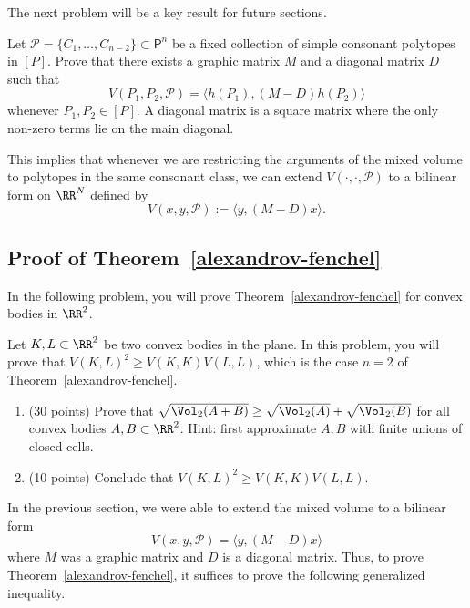 \documentclass[11pt]{article}
\begin{document}
The next problem will be a key result for future sections. 

\begin{prob} [30 points]
    Let $\mathcal{P} = \{C_1, \ldots, C_{n-2}\} \subset \mathsf{P}^n$ be a fixed collection of simple consonant polytopes in $[P]$. Prove that there exists a graphic matrix $M$ and a diagonal matrix $D$ such that 
    \[
        V(P_1, P_2, \mathcal{P}) = \langle h(P_1), (M-D) h(P_2) \rangle    
    \]
    whenever $P_1, P_2 \in [P]$. A diagonal matrix is a square matrix where the only non-zero terms lie on the main diagonal. 
\end{prob}

This implies that whenever we are restricting the arguments of the mixed volume to polytopes in the same consonant class, we can extend $V( \cdot, \cdot, \mathcal{P})$ to a bilinear form on $\RR^N$ defined by 
\[
    V(x, y, \mathcal{P}) := \langle y, (M-D)x \rangle. 
\]

\subsection{Proof of Theorem~\ref{alexandrov-fenchel}}
In the following problem, you will prove Theorem~\ref{alexandrov-fenchel} for convex bodies in $\RR^2$. 

\begin{prob} [40 points]
    Let $K, L \subset \RR^2$ be two convex bodies in the plane. In this problem, you will prove that $V(K, L)^2 \geq V(K, K) V(L, L)$, which is the case $n = 2$ of Theorem~\ref{alexandrov-fenchel}.
    \begin{enumerate}[label = (\alph*)]
        \item (30 points) Prove that $\sqrt{\Vol_2(A + B)} \geq \sqrt{\Vol_2(A)} + \sqrt{\Vol_2(B)}$ for all convex bodies $A, B \subset \RR^2$. Hint: first approximate $A, B$ with finite unions of closed cells. 
        
        \item (10 points) Conclude that $V(K, L)^2 \geq V(K, K) V(L, L)$. 
    \end{enumerate}
\end{prob}

In the previous section, we were able to extend the mixed volume to a bilinear form 
\[
    V(x, y, \mathcal{P}) = \langle y, (M-D) x \rangle    
\]
where $M$ was a graphic matrix and $D$ is a diagonal matrix. Thus, to prove Theorem~\ref{alexandrov-fenchel}, it suffices to prove the following generalized inequality. 
\end{document}
